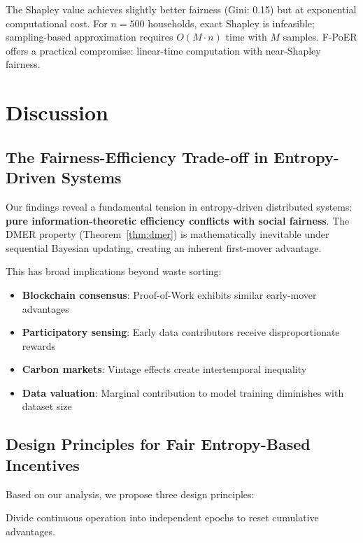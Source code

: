 \documentclass[12pt,a4paper]{article}
\begin{document}
The Shapley value achieves slightly better fairness (Gini: 0.15) but at exponential computational cost. For $n=500$ households, exact Shapley is infeasible; sampling-based approximation\cite{okhrati2021multilinear} requires $O(M \cdot n)$ time with $M$ samples. F-PoER offers a practical compromise: linear-time computation with near-Shapley fairness.

\section{Discussion}

\subsection{The Fairness-Efficiency Trade-off in Entropy-Driven Systems}

Our findings reveal a fundamental tension in entropy-driven distributed systems: \textbf{pure information-theoretic efficiency conflicts with social fairness}. The DMER property (Theorem~\ref{thm:dmer}) is mathematically inevitable under sequential Bayesian updating, creating an inherent first-mover advantage.

This has broad implications beyond waste sorting:
\begin{itemize}
    \item \textbf{Blockchain consensus}: Proof-of-Work exhibits similar early-mover advantages\cite{nakamoto2008bitcoin}
    \item \textbf{Participatory sensing}: Early data contributors receive disproportionate rewards\cite{ganti2011mobile}
    \item \textbf{Carbon markets}: Vintage effects create intertemporal inequality\cite{worldbank2022carbon}
    \item \textbf{Data valuation}: Marginal contribution to model training diminishes with dataset size\cite{ghorbani2019data}
\end{itemize}

\subsection{Design Principles for Fair Entropy-Based Incentives}

Based on our analysis, we propose three design principles:

\begin{principle}
Divide continuous operation into independent epochs to reset cumulative advantages.
\end{principle}
\end{document}
